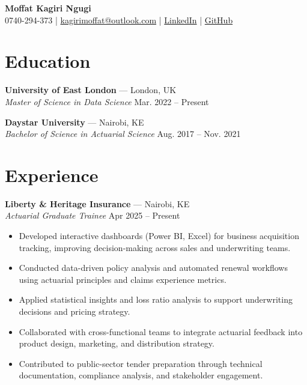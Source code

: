 \documentclass[11pt,a4paper]{article}
\begin{document}
\begin{center}
    {\LARGE \textbf{Moffat Kagiri Ngugi}}\\[0.5em]
    0740-294-373 \quad | \quad \href{mailto:kagirimoffat@outlook.com}{kagirimoffat@outlook.com} \quad | \quad
    \href{https://www.linkedin.com/in/moffatkagiri/}{LinkedIn} \quad | \quad
    \href{https://github.com/moffat-kagiri}{GitHub}
\end{center}

\section*{Education}
\justifying
\textbf{University of East London} — London, UK \\
\textit{Master of Science in Data Science} \hfill Mar. 2022 – Present

\textbf{Daystar University} — Nairobi, KE \\
\textit{Bachelor of Science in Actuarial Science} \hfill Aug. 2017 – Nov. 2021

\section*{Experience}
\textbf{Liberty \& Heritage Insurance} — Nairobi, KE \\
\textit{Actuarial Graduate Trainee} \hfill Apr 2025 – Present
\begin{itemize}[leftmargin=*]
    \item Developed interactive dashboards (Power BI, Excel) for business acquisition tracking, improving decision-making across sales and underwriting teams.
    \item Conducted data-driven policy analysis and automated renewal workflows using actuarial principles and claims experience metrics.
    \item Applied statistical insights and loss ratio analysis to support underwriting decisions and pricing strategy.
    \item Collaborated with cross-functional teams to integrate actuarial feedback into product design, marketing, and distribution strategy.
    \item Contributed to public-sector tender preparation through technical documentation, compliance analysis, and stakeholder engagement.
\end{itemize}
\end{document}
